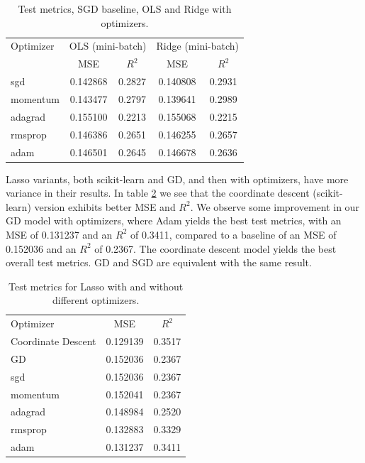\documentclass[amssymb,twocolumn,aps,floatfix]{revtex4-2}
\begin{document}
\begin{table}[h!]
\caption{Test metrics, SGD baseline, OLS and Ridge with optimizers.}
\label{tab:mb-optimizers-1000}
\begin{ruledtabular}
\begin{tabular}{lcccc} 
Optimizer & \multicolumn{2}{c}{OLS (mini-batch)} & \multicolumn{2}{c}{Ridge (mini-batch)} \\
\colrule
 & MSE & $R^2$ & MSE & $R^2$ \\
\colrule
sgd       & 0.142868 & 0.2827 & 0.140808 & 0.2931 \\
momentum  & 0.143477 & 0.2797 & 0.139641 & 0.2989 \\
adagrad   & 0.155100 & 0.2213 & 0.155068 & 0.2215 \\
rmsprop   & 0.146386 & 0.2651 & 0.146255 & 0.2657 \\
adam      & 0.146501 & 0.2645 & 0.146678 & 0.2636 \\
\end{tabular}
\end{ruledtabular}
\end{table}

Lasso variants, both scikit-learn and GD, and then with optimizers, have more variance in their results. In table \ref{tab:lasso-optimizers} we see that the coordinate descent (scikit-learn) version exhibits better MSE and $R^2$. We observe some improvement in our GD model with optimizers, where Adam yields the best test metrics, with an MSE of 0.131237 and an $R^2$ of 0.3411, compared to a baseline of an MSE of 0.152036 and an $R^2$ of 0.2367. The coordinate descent model yields the best overall test metrics. GD and SGD are equivalent with the same result. 


\begin{table}[h!]
\caption{Test metrics for Lasso with and without different optimizers.}
\label{tab:lasso-optimizers}
\begin{ruledtabular}
\begin{tabular}{lcc}
Optimizer & MSE & $R^2$ \\
\colrule
Coordinate Descent &  0.129139 & 0.3517 \\
GD        & 0.152036 & 0.2367 \\
sgd       & 0.152036 & 0.2367 \\
momentum  & 0.152041 & 0.2367 \\
adagrad   & 0.148984 & 0.2520 \\
rmsprop   & 0.132883 & 0.3329 \\
adam      & 0.131237 & 0.3411 \\
\end{tabular}
\end{ruledtabular}
\end{table}
\end{document}
